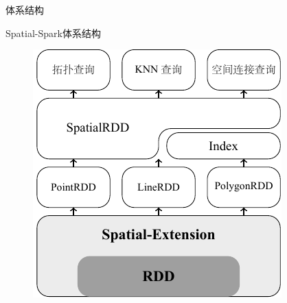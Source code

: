 \begin{frame}[c]{体系结构}
    \begin{center}
        \alert{Spatial-Spark体系结构}
    

    \vspace{1em}
    \begin{figure}
        \includegraphics[scale=1.0]{figures/spatialspark.pdf}
    \end{figure}
    \end{center}
\end{frame}


